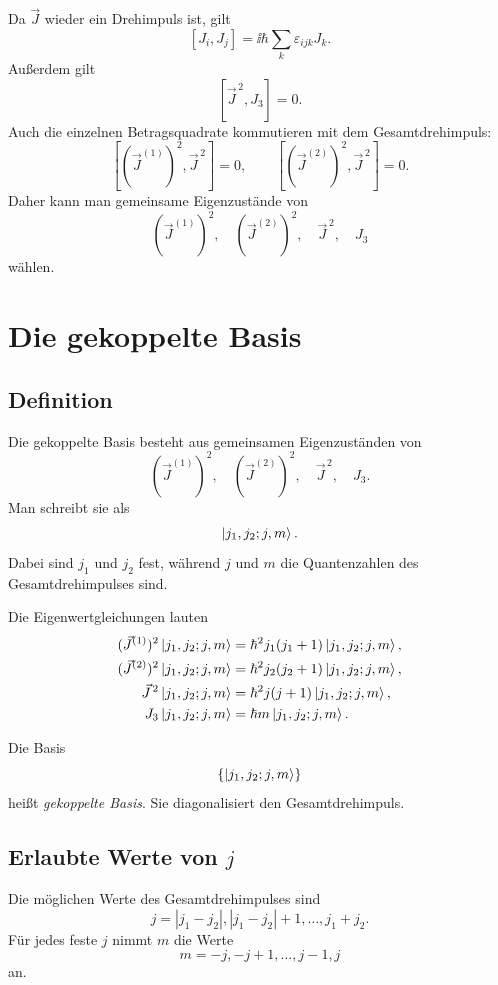 Da \(\vec J\) wieder ein Drehimpuls ist, gilt
\[
    [J_i,J_j]=\ii\hbar\sum_k\varepsilon_{ijk}J_k.
\]
Außerdem gilt
\[
    [\vec J^{\,2},J_3]=0.
\]
Auch die einzelnen Betragsquadrate kommutieren mit dem Gesamtdrehimpuls:
\[
    [(\vec J^{(1)})^2,\vec J^{\,2}]=0,
    \qquad
    [(\vec J^{(2)})^2,\vec J^{\,2}]=0.
\]
Daher kann man gemeinsame Eigenzustände von
\[
    (\vec J^{(1)})^2,
    \quad
    (\vec J^{(2)})^2,
    \quad
    \vec J^{\,2},
    \quad
    J_3
\]
wählen.

\section{Die gekoppelte Basis}

\subsection{Definition}

Die gekoppelte Basis besteht aus gemeinsamen Eigenzuständen von
\[
    (\vec J^{(1)})^2,
    \quad
    (\vec J^{(2)})^2,
    \quad
    \vec J^{\,2},
    \quad
    J_3.
\]
Man schreibt sie als
\[
    \left|j_1,j_2;j,m\right\rangle.
\]
Dabei sind \(j_1\) und \(j_2\) fest, während \(j\) und \(m\) die Quantenzahlen des Gesamtdrehimpulses sind.

Die Eigenwertgleichungen lauten
\begin{align*}
    (\vec J^{(1)})^2\left|j_1,j_2;j,m\right\rangle
    &=\hbar^2j_1(j_1+1)\left|j_1,j_2;j,m\right\rangle,\\
    (\vec J^{(2)})^2\left|j_1,j_2;j,m\right\rangle
    &=\hbar^2j_2(j_2+1)\left|j_1,j_2;j,m\right\rangle,\\
    \vec J^{\,2}\left|j_1,j_2;j,m\right\rangle
    &=\hbar^2j(j+1)\left|j_1,j_2;j,m\right\rangle,\\
    J_3\left|j_1,j_2;j,m\right\rangle
    &=\hbar m\left|j_1,j_2;j,m\right\rangle.
\end{align*}

\begin{definitionbox}
Die Basis
\[
    \left\{ \left|j_1,j_2;j,m\right\rangle \right\}
\]
heißt \emph{gekoppelte Basis}. Sie diagonalisiert den Gesamtdrehimpuls.
\end{definitionbox}

\subsection{Erlaubte Werte von \texorpdfstring{\(j\)}{j}}

Die möglichen Werte des Gesamtdrehimpulses sind
\[
    j=|j_1-j_2|,
    |j_1-j_2|+1,
    \dots,
    j_1+j_2.
\]
Für jedes feste \(j\) nimmt \(m\) die Werte
\[
    m=-j,-j+1,\dots,j-1,j
\]
an.

